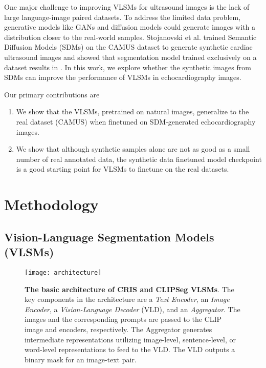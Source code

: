 \documentclass[runningheads]{llncs}
\begin{document}
One major challenge to improving VLSMs for ultrasound images is the lack of large language-image paired datasets.
To address the limited data problem, generative models like GANs \cite{goodfellow2014generative} and diffusion models \cite{ho2020denoising} could generate images with a distribution closer to the real-world samples.
Stojanovski et al. \cite{stojanovski2023echo} trained Semantic Diffusion Models (SDMs) \cite{wang2022semantic} on the CAMUS dataset \cite{leclerc2019deep} to generate synthetic cardiac ultrasound images and showed that  segmentation model trained exclusively on a  dataset results in .
In this work, we explore whether the synthetic images from SDMs can improve the performance of VLSMs in echocardiography images.

Our primary contributions are 

\begin{enumerate}
    \item We show that the VLSMs, pretrained on natural images, generalize to the real dataset (CAMUS) when finetuned on SDM-generated echocardiography images.
    \item We show that although  synthetic samples alone are not as good as a small number of real annotated data, the synthetic data finetuned model checkpoint is a good starting point for VLSMs to finetune on the real datasets.
\end{enumerate}

\section{Methodology}
\label{sec:methodology}

\subsection{Vision-Language Segmentation Models (VLSMs)}
\label{sec:vlsm}

\begin{figure}[t]
    \centering
    \texttt{[image: architecture]}
    \caption{
        \textbf{The basic architecture of CRIS and CLIPSeg VLSMs}\cite{anon2023sup}.
        The key components in the architecture are a \textit{Text Encoder}, an \textit{Image Encoder}, a \textit{Vision-Language Decoder} (VLD), and an \textit{Aggregator}.
        The images and the corresponding prompts are passed to the CLIP image and  encoders, respectively. 
        The Aggregator generates intermediate representations utilizing image-level, sentence-level, or word-level representations to feed to the VLD.
        The VLD outputs a binary mask for an image-text pair. 
    }
    \label{fig: architecture}
\end{figure}
\end{document}
